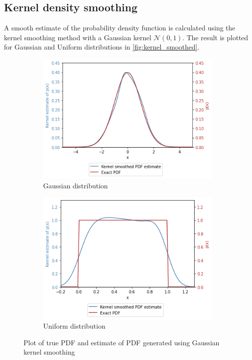 \documentclass[a4paper]{article}
\begin{document}

\subsection{Kernel density smoothing}

A smooth estimate of the probability density function is calculated using the kernel smoothing method with a Gaussian
kernel $\mathcal{N}(0, 1)$. The result is plotted for Gaussian and Uniform distributions in \autoref{fig:kernel_smoothed}.

\begin{figure}[h]
    \centering
    \begin{subfigure}[b]{0.45\textwidth}
        \centering
        \includegraphics[width=\textwidth]{figures/gaussian_kernel_smoothed.png}
        \caption{Gaussian distribution}
        \label{fig:gaussian_kernel_smoothed}
    \end{subfigure}
    \hfill
    \begin{subfigure}[b]{0.45\textwidth}
        \centering
        \includegraphics[width=\textwidth]{figures/uniform_kernel_smoothed.png}
        \caption{Uniform distribution}
        \label{fig:uniform_kernel_smoothed}
    \end{subfigure}
    \caption{Plot of true PDF and estimate of PDF generated using Gaussian kernel smoothing}
    \label{fig:kernel_smoothed}
\end{figure}
\end{document}
